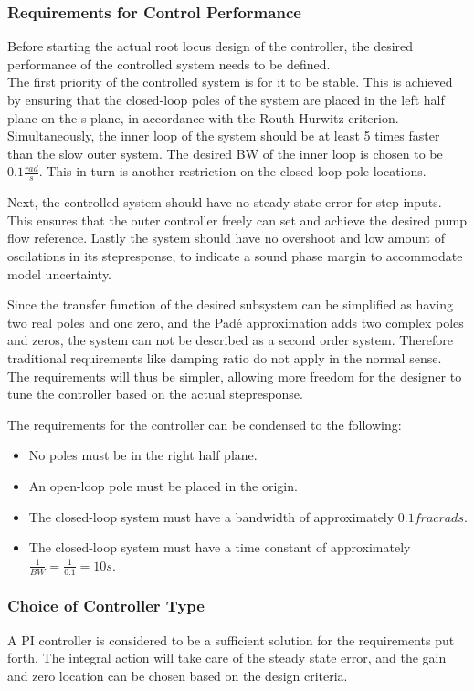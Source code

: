 \subsubsection{Requirements for Control Performance}
Before starting the actual root locus design of the controller, the desired performance of the controlled system needs to be defined. \\
The first priority of the controlled system is for it to be stable. This is achieved by ensuring that the closed-loop poles of the system are placed in the left half plane on the s-plane, in accordance with the Routh-Hurwitz criterion. Simultaneously, the inner loop of the system should be at least 5 times faster than the slow outer system. The desired BW of the inner loop is chosen to be $0.1 \si{\frac{rad}{s}}$. This in turn is another restriction on the closed-loop pole locations.

Next, the controlled system should have no steady state error for step inputs. This ensures that the outer controller freely can set and achieve the desired pump flow reference. Lastly the system should have no overshoot and low amount of oscilations in its stepresponse, to indicate a sound phase margin to accommodate model uncertainty.

Since the transfer function of the desired subsystem can be simplified as having two real poles and one zero, and the Padé approximation adds two complex poles and zeros, the system can not be described as a second order system. Therefore traditional requirements like damping ratio do not apply in the normal sense. The requirements will thus be simpler, allowing more freedom for the designer to tune the controller based on the actual stepresponse.

The requirements for the controller can be condensed to the following: 
\begin{itemize}
	\item No poles must be in the right half plane.
	\item An open-loop pole must be placed in the origin.
	\item The closed-loop system must have a bandwidth of approximately $0.1 \si{frac{rad}{s}}$.
	\item The closed-loop system must have a time constant of approximately $\frac{1}{BW} = \frac{1}{0.1} = 10 \si{s}$.
\end{itemize}



\subsubsection{Choice of Controller Type}
A PI controller is considered to be a sufficient solution for the requirements put forth. The integral action will take care of the steady state error, and the gain and zero location can be chosen based on the design criteria.

